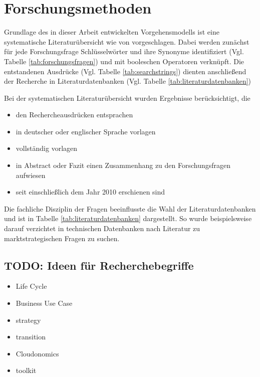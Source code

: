 \section{Forschungsmethoden}
\label{cha:method}
Grundlage des in dieser Arbeit entwickelten Vorgehensmodells ist eine
systematische Literaturübersicht wie von 
vorgeschlagen. Dabei werden zunächst für jede Forschungsfrage Schlüsselwörter
und ihre Synonyme identifiziert (Vgl. Tabelle
\ref{tab:forschungsfragen}) und mit booleschen Operatoren
verknüpft. Die entstandenen Ausdrücke (Vgl. Tabelle
\ref{tab:searchstrings}) dienten anschließend der Recherche in
Literaturdatenbanken (Vgl. Tabelle \ref{tab:literaturdatenbanken})


Bei der systematischen Literaturübersicht wurden Ergebnisse berücksichtigt, die
\begin{itemize}
	\item den Rechercheausdrücken entsprachen
	\item in deutscher oder englischer Sprache vorlagen
	\item vollständig vorlagen
	\item in Abstract oder Fazit einen Zusammenhang zu den Forschungsfragen
aufwiesen
	\item seit einschließlich dem Jahr 2010 erschienen sind
\end{itemize}

Die fachliche Disziplin der Fragen beeinflusste die Wahl der
Literaturdatenbanken und ist in Tabelle \ref{tab:literaturdatenbanken}
dargestellt. So wurde beispielsweise darauf verzichtet in technischen
Datenbanken nach Literatur zu marktstrategischen Fragen zu suchen.



\subsection{TODO: Ideen für Recherchebegriffe}
\begin{itemize}
	\item Life Cycle
	\item Business Use Case
	\item strategy
	\item transition
	\item Cloudonomics
	\item toolkit
\end{itemize}


\begin{comment}
In diesem Kapitel erläutern Sie ihre Forschungsmethode unter Verwendung von
entsprechenden Quellen.
Begründen Sie auch, warum Sie sich für diese Forschungsmethode entschieden
haben
und warum sie geeignet ist, die vorliegende Forschungsfrage zu beantworten.
\end{comment}
